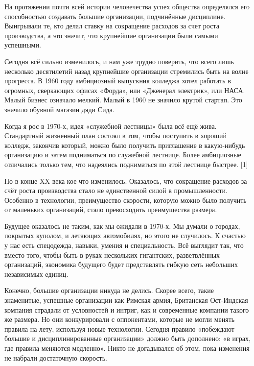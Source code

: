 \documentclass[ebook,12pt,oneside,openany]{memoir}
\begin{document}
\maketitle

На протяжении почти всей истории человечества успех общества
определялся его способностью создавать большие организации,
подчинённые дисциплине. Выигрывали те, кто делал ставку на сокращение
расходов за счет роста производства, а это значит, что крупнейшие
организации были самыми успешными.

Сегодня всё сильно изменилось, и нам уже трудно поверить, что всего
лишь несколько десятилетий назад крупнейшие организации стремились
быть на волне прогресса. В 1960 году амбициозный выпускник колледжа
хотел работать в огромных, сверкающих офисах «Форда», или «Дженерал
электрик», или НАСА. Малый бизнес означало мелкий. Малый в 1960 не
значило крутой стартап. Это значило обувной магазин дяди Сида.

Когда я рос в 1970-х, идея «служебной лестницы» была всё ещё жива.
Стандартный жизненный план состоял в том, чтобы поступить в хороший
колледж, закончив который, можно было получить приглашение в
какую-нибудь организацию и затем подниматься по служебной лестнице.
Более амбициозные отличались только тем, что надеялись подниматься по
этой лестнице быстрее. [1]

Но в конце XX века кое-что изменилось. Оказалось, что сокращение
расходов за счёт роста производства стало не единственной силой в
промышленности. Особенно в технологии, преимущество скорости, которую
можно было получить от маленьких организаций, стало превосходить
преимущества размера.

Будущее оказалось не таким, как мы ожидали в 1970-х. Мы думали о
городах, покрытых куполом, и летающих автомобилях, но этого не
случилось. К счастью у нас есть спецодежда, навыки, умения и
специальность. Всё выглядит так, что вместо того, чтобы быть в руках
нескольких гигантских, разветвлённых организаций, экономика будущего
будет представлять гибкую сеть небольших независимых единиц.

Конечно, большие организации никуда не делись. Скорее всего, такие
знаменитые, успешные организации как Римская армия, Британская
Ост-Индская компания страдали от условностей и интриг, как и
современные компании такого же размера. Но они конкурировали с
оппонентами, которые не могли менять правила на лету, используя новые
технологии. Сегодня правило «побеждают большие и дисциплинированные
организации» должно быть дополнено: «в играх, где правила меняются
медленно». Никто не догадывался об этом, пока изменения не набрали
достаточную скорость.
\end{document}
